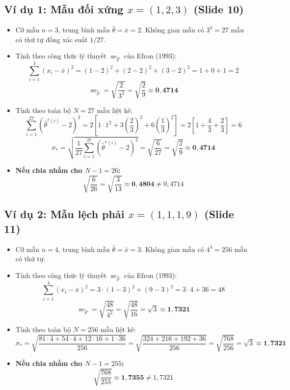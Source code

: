 \documentclass[10pt,a4paper]{article}
\begin{document}
\subsection{Ví dụ 1: Mẫu đối xứng \texorpdfstring{$x = (1, 2, 3)$}{x = (1, 2, 3)} (Slide 10)}
\begin{itemize}
    \item Cỡ mẫu $n=3$, trung bình mẫu $\hat\theta = \bar x = 2$. Không gian mẫu có $3^3 = 27$ mẫu có thứ tự đồng xác suất $1/27$.
    \item Tính theo công thức lý thuyết $\operatorname{se}_{\hat F}$ của Efron (1993):
    \[
    \sum_{i=1}^3 (x_i - \bar x)^2 = (1-2)^2 + (2-2)^2 + (3-2)^2 = 1 + 0 + 1 = 2
    \]
    \[
    \operatorname{se}_{\hat F} = \sqrt{\frac{2}{3^2}} = \sqrt{\frac{2}{9}} \approx \mathbf{0{,}4714}
    \]
    \item Tính theo toàn bộ $N=27$ mẫu liệt kê:
    \[
    \sum_{i=1}^{27} (\hat\theta^{*(i)} - 2)^2 = 2\left[1\cdot 1^2 + 3\left(\frac{2}{3}\right)^2 + 6\left(\frac{1}{3}\right)^2\right] = 2\left[1 + \frac{4}{3} + \frac{2}{3}\right] = 6
    \]
    \[
    \sigma_* = \sqrt{\frac{1}{27}\sum_{i=1}^{27} (\hat\theta^{*(i)} - 2)^2} = \sqrt{\frac{6}{27}} = \sqrt{\frac{2}{9}} \approx \mathbf{0{,}4714}
    \]
    \item \textbf{Nếu chia nhầm cho $N-1 = 26$:}
    \[
    \sqrt{\frac{6}{26}} = \sqrt{\frac{3}{13}} \approx \mathbf{0{,}4804} \neq 0{,}4714
    \]
\end{itemize}

\subsection{Ví dụ 2: Mẫu lệch phải \texorpdfstring{$x = (1, 1, 1, 9)$}{x = (1, 1, 1, 9)} (Slide 11)}
\begin{itemize}
    \item Cỡ mẫu $n=4$, trung bình mẫu $\hat\theta = \bar x = 3$. Không gian mẫu có $4^4 = 256$ mẫu có thứ tự.
    \item Tính theo công thức lý thuyết $\operatorname{se}_{\hat F}$ của Efron (1993):
    \[
    \sum_{i=1}^4 (x_i - \bar x)^2 = 3\cdot(1-3)^2 + (9-3)^2 = 3\cdot 4 + 36 = 48
    \]
    \[
    \operatorname{se}_{\hat F} = \sqrt{\frac{48}{4^2}} = \sqrt{\frac{48}{16}} = \sqrt{3} \approx \mathbf{1{,}7321}
    \]
    \item Tính theo toàn bộ $N=256$ mẫu liệt kê:
    \[
    \sigma_* = \sqrt{\frac{81\cdot 4 + 54\cdot 4 + 12\cdot 16 + 1\cdot 36}{256}} = \sqrt{\frac{324 + 216 + 192 + 36}{256}} = \sqrt{\frac{768}{256}} = \sqrt{3} \approx \mathbf{1{,}7321}
    \]
    \item \textbf{Nếu chia nhầm cho $N-1 = 255$:}
    \[
    \sqrt{\frac{768}{255}} \approx \mathbf{1{,}7355} \neq 1{,}7321
    \]
\end{itemize}
\end{document}

